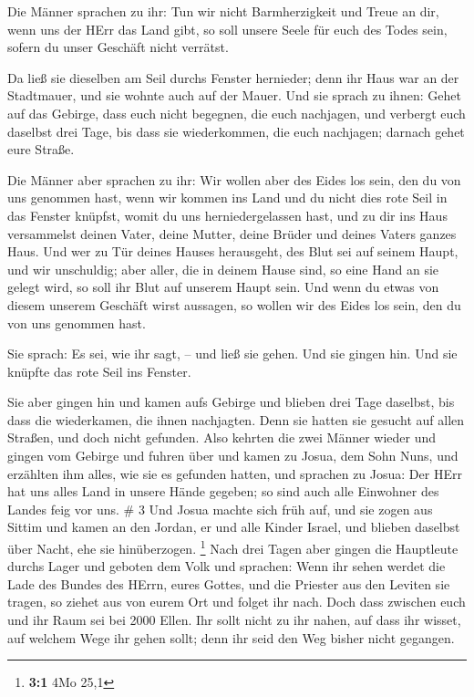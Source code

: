  Die Männer sprachen zu ihr: Tun wir nicht Barmherzigkeit
und Treue an dir, wenn uns der HErr das Land gibt, so soll unsere Seele
für euch des Todes sein, sofern du unser Geschäft nicht verrätst.

 Da ließ sie dieselben am Seil durchs Fenster hernieder;
denn ihr Haus war an der Stadtmauer, und sie wohnte auch auf der Mauer.
 Und sie sprach zu ihnen: Gehet auf das Gebirge, dass euch
nicht begegnen, die euch nachjagen, und verbergt euch daselbst drei
Tage, bis dass sie wiederkommen, die euch nachjagen; darnach gehet eure
Straße.

 Die Männer aber sprachen zu ihr: Wir wollen aber des Eides
los sein, den du von uns genommen hast,  wenn wir kommen
ins Land und du nicht dies rote Seil in das Fenster knüpfst, womit du
uns herniedergelassen hast, und zu dir ins Haus versammelst deinen
Vater, deine Mutter, deine Brüder und deines Vaters ganzes Haus.
 Und wer zu Tür deines Hauses herausgeht, des Blut sei auf
seinem Haupt, und wir unschuldig; aber aller, die in deinem Hause sind,
so eine Hand an sie gelegt wird, so soll ihr Blut auf unserem Haupt
sein.  Und wenn du etwas von diesem unserem Geschäft wirst
aussagen, so wollen wir des Eides los sein, den du von uns genommen
hast.

 Sie sprach: Es sei, wie ihr sagt, -- und ließ sie gehen.
Und sie gingen hin. Und sie knüpfte das rote Seil ins Fenster.

 Sie aber gingen hin und kamen aufs Gebirge und blieben
drei Tage daselbst, bis dass die wiederkamen, die ihnen nachjagten. Denn
sie hatten sie gesucht auf allen Straßen, und doch nicht gefunden.
 Also kehrten die zwei Männer wieder und gingen vom Gebirge
und fuhren über und kamen zu Josua, dem Sohn Nuns, und erzählten ihm
alles, wie sie es gefunden hatten,  und sprachen zu Josua:
Der HErr hat uns alles Land in unsere Hände gegeben; so sind auch alle
Einwohner des Landes feig vor uns. \# 3  Und Josua machte
sich früh auf, und sie zogen aus Sittim und kamen an den Jordan, er und
alle Kinder Israel, und blieben daselbst über Nacht, ehe sie
hinüberzogen. \footnote{\textbf{3:1} 4Mo 25,1}  Nach drei
Tagen aber gingen die Hauptleute durchs Lager  und geboten
dem Volk und sprachen: Wenn ihr sehen werdet die Lade des Bundes des
HErrn, eures Gottes, und die Priester aus den Leviten sie tragen, so
ziehet aus von eurem Ort und folget ihr nach.  Doch dass
zwischen euch und ihr Raum sei bei 2000 Ellen. Ihr sollt nicht zu ihr
nahen, auf dass ihr wisset, auf welchem Wege ihr gehen sollt; denn ihr
seid den Weg bisher nicht gegangen.


